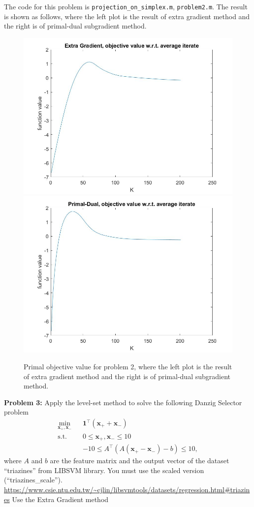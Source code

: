 \documentclass{article}
\newcommand{\bx}{{\mathbf x}}
\begin{document}
The code for this problem is \texttt{projection\_on\_simplex.m}, \texttt{problem2.m}. The result is shown as follows, where the left plot is the result of extra gradient method and the right is of primal-dual subgradient method.

\begin{figure}[h]
\centering
\vbox{
	\includegraphics[scale=0.2]{problem2_extra_gradient.jpg}
	\includegraphics[scale=0.2]{problem2_primal_dual.jpg}
}
\label{problem2-result}
\caption{Primal objective value for problem 2, where the left plot is the result of extra gradient method and the right is of primal-dual subgradient method.}
\end{figure}


\noindent\textbf{Problem 3:} Apply the level-set method to solve the following Danzig Selector problem
\begin{eqnarray*}
\min_{\bx_+,\bx_-}&& \mathbf{1}^\top(\bx_++\bx_-)\\
\text{s.t.} &&0\leq \bx_+,\bx_-\leq 10\\
&& -10\leq A^\top(A(\bx_+-\bx_-)-b)\leq 10,
\end{eqnarray*}
where $A$ and $b$ are the feature matrix and the output vector of the dataset ``triazines'' from LIBSVM library. You must use the scaled version (``triazines\_scale'').
\url{https://www.csie.ntu.edu.tw/~cjlin/libsvmtools/datasets/regression.html#triazines}
Use the Extra Gradient method 
\bigskip
\end{document}
